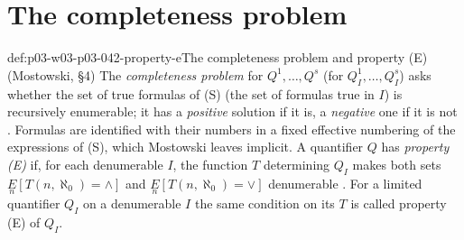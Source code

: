 \section{The completeness problem}
\label{sec:p03-w03-p03-042-completeness-problem}

\begin{hbdefinition}{def:p03-w03-p03-042-property-e}{The completeness problem and property (E) (Mostowski, \S4)}
The \emph{completeness problem} for \(Q^1,\ldots,Q^s\) (for
\(Q^1_I,\ldots,Q^s_I\)) asks whether the set of true formulas of (S) (the
set of formulas true in \(I\)) is recursively enumerable; it has a
\emph{positive} solution if it is, a \emph{negative} one if it is not
\cite[p.~17]{Mostowski1957}.  Formulas are identified with their numbers
in a fixed effective numbering of the expressions of (S), which
Mostowski leaves implicit.  A quantifier
\(Q\) has \emph{property (E)} if, for each denumerable \(I\), the function
\(T\) determining \(Q_I\) makes both sets
\(\underset{n}{E}[T(n,\aleph_0)=\wedge]\) and
\(\underset{n}{E}[T(n,\aleph_0)=\vee]\) denumerable
\cite[p.~17]{Mostowski1957}.  For a limited quantifier \(Q_I\) on a
denumerable \(I\) the same condition on its \(T\) is called property (E)
of \(Q_I\).
\end{hbdefinition}

